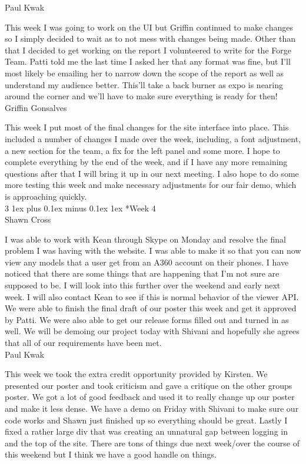 \documentclass[letterpaper, 10pt, draftclsnofoot, compsoc, onecolumn]{IEEEtran}
\makeatletter
\def\subsubsection{\@startsection{subsubsection}%
                                 {3}%
                                 {\z@}%
                                 {1ex plus 0.1ex minus 0.1ex}%
                                 {1ex}%
                                 {\normalfont\normalsize}}%
\makeatother
\begin{document}
Paul Kwak

This week I was going to work on the UI but Griffin continued to make changes so I simply decided to wait as to not mess with changes being made. Other than that I decided to get working on the report I volunteered to write for the Forge Team. Patti told me the last time I asked her that any format was fine, but I'll most likely be emailing her to narrow down the scope of the report as well as understand my audience better. This'll take a back burner as expo is nearing around the corner and we'll have to make sure everything is ready for then!\\

Griffin Gonsalves

This week I put most of the final changes for the site interface into place. This included a number of changes I made over the week, including, a font adjustment, a new section for the team, a fix for the left panel and some more. I hope to complete everything by the end of the week, and if I have any more remaining questions after that I will bring it up in our next meeting. I also hope to do some more testing this week and make necessary adjustments for our fair demo, which is approaching quickly.\\

\subsubsection*{Week 4}\hspace*{\fill} \\
Shawn Cross

I was able to work with Kean through Skype on Monday and resolve the final problem I was having with the website. I was able to make it so that you can now view any models that a user get from an A360 account on their phones. I have noticed that there are some things that are happening that I'm not sure are supposed to be. I will look into this further over the weekend and early next week. I will also contact Kean to see if this is normal behavior of the viewer API. We were able to finish the final draft of our poster this week and get it approved by Patti. We were also able to get our release forms filled out and turned in as well. We will be demoing our project today with Shivani and hopefully she agrees that all of our requirements have been met.\\

Paul Kwak

This week we took the extra credit opportunity provided by Kirsten. We presented our poster and took criticism and gave a critique on the other groups poster. We got a lot of good feedback and used it to really change up our poster and make it less dense. We have a demo on Friday with Shivani to make sure our code works and Shawn just finished up so everything should be great. Lastly I fixed a rather large div that was creating an unnatural gap between logging in and the top of the site. There are tons of things due next week/over the course of this weekend but I think we have a good handle on things.\\
\end{document}
